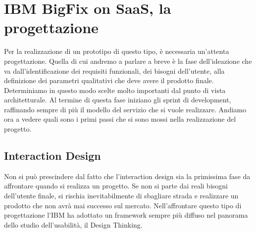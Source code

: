 \chapter{IBM BigFix on SaaS, la progettazione}
Per la realizzazione di un prototipo di questo tipo, è necessaria un'attenta progettazione. Quella di cui andremo a parlare a breve è la fase dell'ideazione che va dall'identificazione dei requisiti funzionali, dei bisogni dell'utente, alla definizione dei parametri qualitativi che deve avere il prodotto finale. Determiniamo in questo modo scelte molto importanti dal punto di vista architetturale. Al termine di questa fase iniziano gli sprint di development, raffinando sempre di più il modello del servizio che si vuole realizzare. Andiamo ora a vedere quali sono i primi passi che si sono mossi nella realizzazione del progetto.

\section{Interaction Design}
Non si può prescindere dal fatto che l'interaction design sia la primissima fase da affrontare quando si realizza un progetto. Se non si parte dai reali bisogni dell'utente finale, si rischia inevitabilmente di sbagliare strada e realizzare un prodotto che non avrà mai successo sul mercato. Nell'affrontare questo tipo di progettazione l'IBM ha adottato un framework sempre più diffuso nel panorama dello studio dell'usabilità, il Design Thinking.

